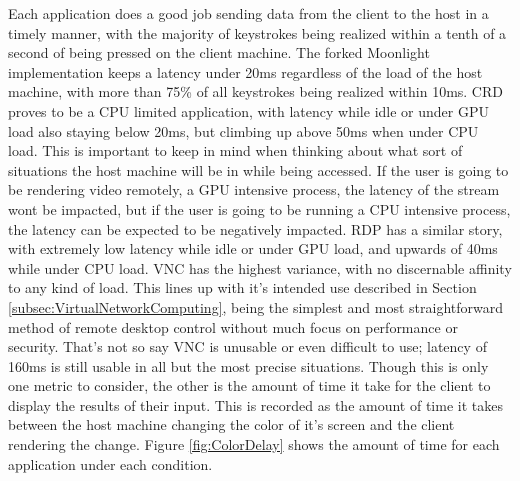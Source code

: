 Each application does a good job sending data from the client to the host in a timely manner, with the majority of keystrokes being realized within a tenth of a second of being pressed on the client machine.
The forked Moonlight implementation keeps a latency under 20ms regardless of the load of the host machine, with more than 75\% of all keystrokes being realized within 10ms.
CRD proves to be a CPU limited application, with latency while idle or under GPU load also staying below 20ms, but climbing up above 50ms when under CPU load.
This is important to keep in mind when thinking about what sort of situations the host machine will be in while being accessed.
If the user is going to be rendering video remotely, a GPU intensive process, the latency of the stream wont be impacted, but if the user is going to be running a CPU intensive process, the latency can be expected to be negatively impacted.
RDP has a similar story, with extremely low latency while idle or under GPU load, and upwards of 40ms while under CPU load.
VNC has the highest variance, with no discernable affinity to any kind of load.
This lines up with it's intended use described in Section \ref{subsec:VirtualNetworkComputing}, being the simplest and most straightforward method of remote desktop control without much focus on performance or security.
That's not so say VNC is unusable or even difficult to use; latency of 160ms is still usable in all but the most precise situations.
Though this is only one metric to consider, the other is the amount of time it take for the client to display the results of their input.
This is recorded as the amount of time it takes between the host machine changing the color of it's screen and the client rendering the change.
Figure \ref{fig:ColorDelay} shows the amount of time for each application under each condition.

